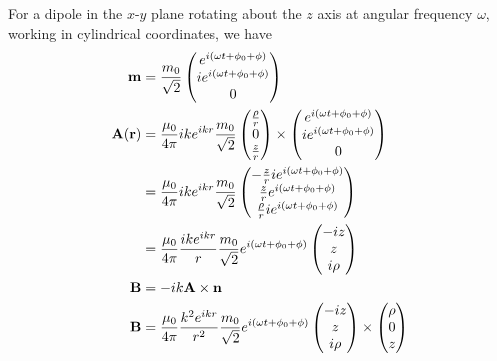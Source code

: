 \documentclass[12pt]{extarticle}
\begin{document}
\begin{outline}
        For a dipole in the \(x\text{-}y\) plane rotating about the \(z\) axis at angular frequency \(\omega\), working in cylindrical coordinates, we have \begin{align*}
            \bf m &= \frac{m_0}{\sqrt{2}}\begin{pmatrix} e^{i(\omega t + \phi_0 + \phi)}\\ ie^{i(\omega t + \phi_0 + \phi)}\\ 0\end{pmatrix} \\
            \bf A (\bf r) &=  \frac{\mu_0}{4\pi} {ike^{ikr}} \frac{m_0}{\sqrt{2}} \begin{pmatrix} \frac{\rho}{r} \\0 \\ \frac{z}{r}\end{pmatrix} \times  \begin{pmatrix} e^{i(\omega t + \phi_0 + \phi)}\\ ie^{i(\omega t + \phi_0 + \phi)}\\ 0\end{pmatrix}\\
            &=  \frac{\mu_0}{4\pi} {ike^{ikr}} \frac{m_0}{\sqrt{2}} \begin{pmatrix} - \frac{z}{r} i e^{i (\omega t + \phi_0 + \phi)} \\ \frac{z}{r}e^{i(\omega t + \phi_0 + \phi)}\\\frac{\rho}{r} i e^{i(\omega t + \phi_0 + \phi)} \end{pmatrix} \\
            &=  \frac{\mu_0}{4\pi} \frac{ike^{ikr}}{r}  \frac{m_0}{\sqrt{2}} e^{i(\omega t + \phi_0 + \phi)} \begin{pmatrix} - iz \\ z\\ i\rho  \end{pmatrix} \\
            \bf B &=  -ik \bf A \times \bf n\\
            \bf B &=  \frac{\mu_0}{4\pi} \frac{k^2e^{ikr}}{r^2}  \frac{m_0}{\sqrt{2}} e^{i(\omega t + \phi_0 + \phi)} \begin{pmatrix} - iz \\ z\\ i\rho  \end{pmatrix} \times \begin{pmatrix} \rho\\ 0\\z \end{pmatrix} \\

\end{align*}
\end{outline}
\end{document}
